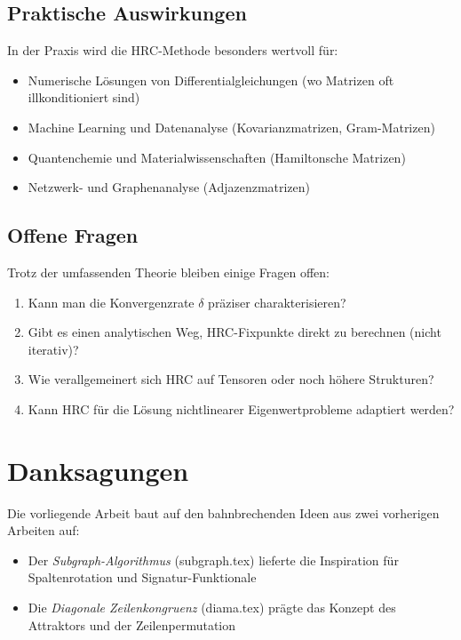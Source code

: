 \documentclass[a4paper,12pt]{article}
\theoremstyle{definition}
\begin{document}
\subsection{Praktische Auswirkungen}

In der Praxis wird die HRC-Methode besonders wertvoll für:

\begin{itemize}
	\item Numerische Lösungen von Differentialgleichungen (wo Matrizen oft illkonditioniert sind)
	\item Machine Learning und Datenanalyse (Kovarianzmatrizen, Gram-Matrizen)
	\item Quantenchemie und Materialwissenschaften (Hamiltonsche Matrizen)
	\item Netzwerk- und Graphenanalyse (Adjazenzmatrizen)
\end{itemize}

\subsection{Offene Fragen}

Trotz der umfassenden Theorie bleiben einige Fragen offen:

\begin{enumerate}
	\item Kann man die Konvergenzrate $\delta$ präziser charakterisieren?
	\item Gibt es einen analytischen Weg, HRC-Fixpunkte direkt zu berechnen (nicht iterativ)?
	\item Wie verallgemeinert sich HRC auf Tensoren oder noch höhere Strukturen?
	\item Kann HRC für die Lösung nichtlinearer Eigenwertprobleme adaptiert werden?
\end{enumerate}

\section{Danksagungen}

Die vorliegende Arbeit baut auf den bahnbrechenden Ideen aus zwei vorherigen Arbeiten auf:

\begin{itemize}
	\item Der \emph{Subgraph-Algorithmus} (subgraph.tex) lieferte die Inspiration für Spaltenrotation und Signatur-Funktionale
	\item Die \emph{Diagonale Zeilenkongruenz} (diama.tex) prägte das Konzept des Attraktors und der Zeilenpermutation
\end{itemize}
\end{document}
